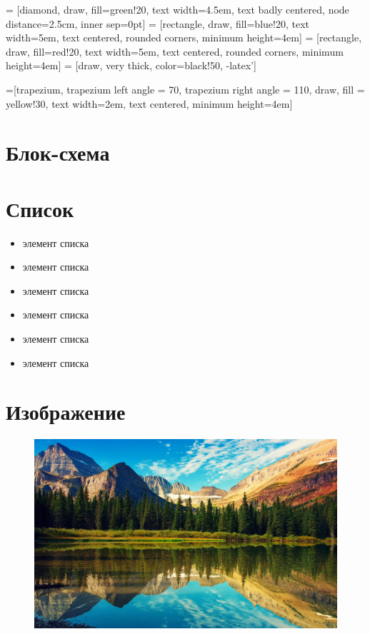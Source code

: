 \documentclass[a4paper, 12pt]{report}
\begin{document}
 = [diamond, draw, fill=green!20,
text width=4.5em, text badly centered, node distance=2.5cm, inner sep=0pt]
 = [rectangle, draw, fill=blue!20,
text width=5em, text centered, rounded corners, minimum height=4em]
 = [rectangle, draw, fill=red!20,
text width=5em, text centered, rounded corners, minimum height=4em]
 = [draw, very thick, color=black!50, -latex']

 =[trapezium,
trapezium left angle = 70,
trapezium right angle = 110, draw,
fill = yellow!30, text width=2em, text centered, minimum height=4em]

\section{Блок-схема}

\section{Список}
\begin{itemize}
	\item элемент списка
	\item элемент списка
	\item элемент списка
	\item элемент списка
	\item элемент списка
	\item элемент списка
\end{itemize}

\section{Изображение}
	
\begin{figure}[h!]
	\centering
	\includegraphics[width=0.7\linewidth]{NameImage.jpg}
	\caption{}
	\label{fig:-91}
\end{figure}
\end{document}

